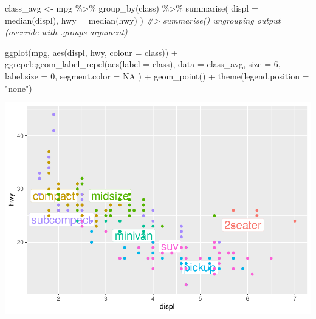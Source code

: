 \documentclass[
]{article}
\newenvironment{Shaded}{\begin{snugshade}}{\end{snugshade}}
\newcommand{\AttributeTok}[1]{\textcolor[rgb]{0.77,0.63,0.00}{#1}}
\newcommand{\CommentTok}[1]{\textcolor[rgb]{0.56,0.35,0.01}{\textit{#1}}}
\newcommand{\ConstantTok}[1]{\textcolor[rgb]{0.00,0.00,0.00}{#1}}
\newcommand{\DecValTok}[1]{\textcolor[rgb]{0.00,0.00,0.81}{#1}}
\newcommand{\FunctionTok}[1]{\textcolor[rgb]{0.00,0.00,0.00}{#1}}
\newcommand{\NormalTok}[1]{#1}
\newcommand{\OtherTok}[1]{\textcolor[rgb]{0.56,0.35,0.01}{#1}}
\newcommand{\SpecialCharTok}[1]{\textcolor[rgb]{0.00,0.00,0.00}{#1}}
\newcommand{\StringTok}[1]{\textcolor[rgb]{0.31,0.60,0.02}{#1}}
\begin{document}
\begin{Shaded}
\begin{Highlighting}[]
\NormalTok{class\_avg }\OtherTok{\textless{}{-}}\NormalTok{ mpg }\SpecialCharTok{\%\textgreater{}\%}
  \FunctionTok{group\_by}\NormalTok{(class) }\SpecialCharTok{\%\textgreater{}\%}
  \FunctionTok{summarise}\NormalTok{(}
    \AttributeTok{displ =} \FunctionTok{median}\NormalTok{(displ),}
    \AttributeTok{hwy =} \FunctionTok{median}\NormalTok{(hwy)}
\NormalTok{  )}
\CommentTok{\#\textgreater{} \textasciigrave{}summarise()\textasciigrave{} ungrouping output (override with \textasciigrave{}.groups\textasciigrave{} argument)}

\FunctionTok{ggplot}\NormalTok{(mpg, }\FunctionTok{aes}\NormalTok{(displ, hwy, }\AttributeTok{colour =}\NormalTok{ class)) }\SpecialCharTok{+}
\NormalTok{  ggrepel}\SpecialCharTok{::}\FunctionTok{geom\_label\_repel}\NormalTok{(}\FunctionTok{aes}\NormalTok{(}\AttributeTok{label =}\NormalTok{ class),}
    \AttributeTok{data =}\NormalTok{ class\_avg,}
    \AttributeTok{size =} \DecValTok{6}\NormalTok{,}
    \AttributeTok{label.size =} \DecValTok{0}\NormalTok{,}
    \AttributeTok{segment.color =} \ConstantTok{NA}
\NormalTok{  ) }\SpecialCharTok{+}
  \FunctionTok{geom\_point}\NormalTok{() }\SpecialCharTok{+}
  \FunctionTok{theme}\NormalTok{(}\AttributeTok{legend.position =} \StringTok{"none"}\NormalTok{)}
\end{Highlighting}
\end{Shaded}

\includegraphics{Journal_files/figure-latex/unnamed-chunk-59-1.pdf}
\end{document}

